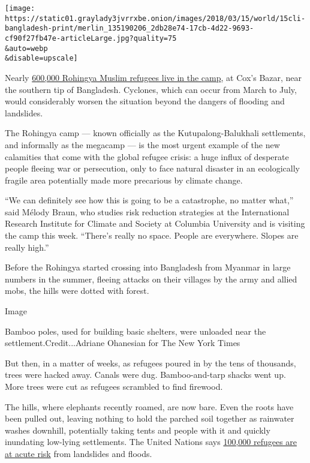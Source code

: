 \texttt{[image: https://static01.graylady3jvrrxbe.onion/images/2018/03/15/world/15cli-bangladesh-print/merlin\_135190206\_2db28e74-17cb-4d22-9693-cf90f27fb47e-articleLarge.jpg?quality=75\\\&auto=webp\\\&disable=upscale]}

Nearly
\href{https://reliefweb.int/sites/reliefweb.int/files/resources/180225_weeklyiscg_sitrep_final.pdf}{600,000
Rohingya Muslim refugees live in the camp}, at Cox's Bazar, near the
southern tip of Bangladesh. Cyclones, which can occur from March to
July, would considerably worsen the situation beyond the dangers of
flooding and landslides.

The Rohingya camp --- known officially as the Kutupalong-Balukhali
settlements, and informally as the megacamp --- is the most urgent
example of the new calamities that come with the global refugee crisis:
a huge influx of desperate people fleeing war or persecution, only to
face natural disaster in an ecologically fragile area potentially made
more precarious by climate change.

``We can definitely see how this is going to be a catastrophe, no matter
what,'' said Mélody Braun, who studies risk reduction strategies at the
International Research Institute for Climate and Society at Columbia
University and is visiting the camp this week. ``There's really no
space. People are everywhere. Slopes are really high.''

Before the Rohingya started crossing into Bangladesh from Myanmar in
large numbers in the summer, fleeing attacks on their villages by the
army and allied mobs, the hills were dotted with forest.

Image

Bamboo poles, used for building basic shelters, were unloaded near the
settlement.Credit...Adriane Ohanesian for The New York Times

But then, in a matter of weeks, as refugees poured in by the tens of
thousands, trees were hacked away. Canals were dug. Bamboo-and-tarp
shacks went up. More trees were cut as refugees scrambled to find
firewood.

The hills, where elephants recently roamed, are now bare. Even the roots
have been pulled out, leaving nothing to hold the parched soil together
as rainwater washes downhill, potentially taking tents and people with
it and quickly inundating low-lying settlements. The United Nations says
\href{https://www.nytimes3xbfgragh.onion/2018/02/13/world/asia/rohingya-monsoons-myanmar-bangladesh.html}{100,000
refugees are at acute risk} from landslides and floods.

